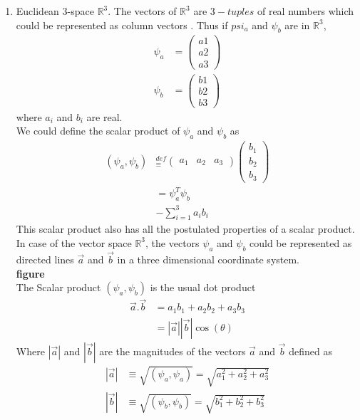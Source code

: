 \begin{enumerate}[label=\textbf{Example \arabic*},start=1]
	
	\item 
	Euclidean 3-space $\mathbb{R}^3$. The vectors of $\mathbb{R}^3$ are $3-tuples$ of real numbers which could be represented as column vectors . Thus if $psi_a$ and $\psi_b$ are in $\mathbb{R}^3$,
	\begin{eqnarray}\label{eqn:2.42-2.43}
		\psi_a &= \left(
		\begin{matrix}
			a1 \\ a2 \\ a3
		\end{matrix}
		\right)\\
		\psi_b &= \left(
		\begin{matrix}
			b1 \\b2 \\b3
		\end{matrix}
		\right)
	\end{eqnarray}
	where $a_i$ and $b_i$ are real. \\
	We could define the scalar product of $\psi_a$ and $\psi_b$ as
	\begin{eqnarray}\label{eqn:2.44-2.46}
		(\psi_a, \psi_b) &_\equiv^{def} 
		\left(
		\begin{matrix}
			a_1 & a_2 & a_3
		\end{matrix}
		\right)\left(
		\begin{matrix}
			b_1 \\ b_2 \\ b_3
		\end{matrix}
		\right) \\
		&= \psi_a^T \psi_b \\
		&- \sum_{i=1}^{3} a_i b_i
	\end{eqnarray}
	This scalar product also has all the postulated properties of a scalar product.\\
	
	In case of the vector space $\mathbb{R}^3$, the vectors $\psi_a$ and $\psi_b$ could be represented as directed lines $\vec{a}$ and $\vec{b}$ in a three dimensional coordinate system.\\
	
	\textbf{figure}
	\\
	The Scalar product $(\psi_a, \psi_b)$ is the usual dot product
	\begin{eqnarray}\label{eqn:2.47-2.48}
		\vec{a} . \vec{b} &= a_1 b_1 + a_2 b_2 + a_3 b_3 \\
		&= |\vec{a}||\vec{b}| \cos(\theta)
	\end{eqnarray}
	Where $|\vec{a}|$ and $|\vec{b}|$ are the magnitudes of the vectors $\vec{a}$ and $\vec{b}$ defined as
	\begin{eqnarray}\label{eqn:2.49-2.50}
		|\vec{a}| &\equiv \sqrt{(\psi_a , \psi_a)} = \sqrt{a_1^2 + a_2^2 + a_3^2} \\
		|\vec{b}| &\equiv \sqrt{(\psi_b, \psi_b)} = \sqrt{b_1^2 + b_2^2 + b_3^2}
	\end{eqnarray}
	
\end{enumerate}
